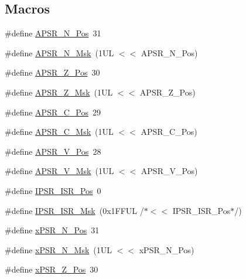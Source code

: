 \subsection*{Macros}
\begin{DoxyCompactItemize}
\item 
\#define \hyperlink{group___c_m_s_i_s___c_o_r_e_gac469528d210043c7bd3f12f0e6824766}{A\+P\+S\+R\+\_\+\+N\+\_\+\+Pos}~31
\item 
\#define \hyperlink{group___c_m_s_i_s___c_o_r_e_gadbc2cf55a026f661b53fadfcf822cef1}{A\+P\+S\+R\+\_\+\+N\+\_\+\+Msk}~(1\+U\+L $<$$<$ A\+P\+S\+R\+\_\+\+N\+\_\+\+Pos)
\item 
\#define \hyperlink{group___c_m_s_i_s___c_o_r_e_ga3661286d108b1aca308d7445685eae3a}{A\+P\+S\+R\+\_\+\+Z\+\_\+\+Pos}~30
\item 
\#define \hyperlink{group___c_m_s_i_s___c_o_r_e_ga1deb4d1aa72bb83d1f79329406f15711}{A\+P\+S\+R\+\_\+\+Z\+\_\+\+Msk}~(1\+U\+L $<$$<$ A\+P\+S\+R\+\_\+\+Z\+\_\+\+Pos)
\item 
\#define \hyperlink{group___c_m_s_i_s___c_o_r_e_ga6cf72aa6f09a168f9e5beda1a4a887b9}{A\+P\+S\+R\+\_\+\+C\+\_\+\+Pos}~29
\item 
\#define \hyperlink{group___c_m_s_i_s___c_o_r_e_ga6d47803fbad455bc10bd1ce59f2f335d}{A\+P\+S\+R\+\_\+\+C\+\_\+\+Msk}~(1\+U\+L $<$$<$ A\+P\+S\+R\+\_\+\+C\+\_\+\+Pos)
\item 
\#define \hyperlink{group___c_m_s_i_s___c_o_r_e_gac62830f67679ccd11658c4172c3e6ea7}{A\+P\+S\+R\+\_\+\+V\+\_\+\+Pos}~28
\item 
\#define \hyperlink{group___c_m_s_i_s___c_o_r_e_ga33305d6701356bff6890b315fe8b5489}{A\+P\+S\+R\+\_\+\+V\+\_\+\+Msk}~(1\+U\+L $<$$<$ A\+P\+S\+R\+\_\+\+V\+\_\+\+Pos)
\item 
\#define \hyperlink{group___c_m_s_i_s___c_o_r_e_ga0e34027584d02c43811ae908a5ca9adf}{I\+P\+S\+R\+\_\+\+I\+S\+R\+\_\+\+Pos}~0
\item 
\#define \hyperlink{group___c_m_s_i_s___c_o_r_e_gaf013a4579a64d1f21f56ea9f1b33ab56}{I\+P\+S\+R\+\_\+\+I\+S\+R\+\_\+\+Msk}~(0x1\+F\+F\+U\+L /$\ast$$<$$<$ I\+P\+S\+R\+\_\+\+I\+S\+R\+\_\+\+Pos$\ast$/)
\item 
\#define \hyperlink{group___c_m_s_i_s___c_o_r_e_ga031eb1b8ebcdb3d602d0b9f2ec82a7ae}{x\+P\+S\+R\+\_\+\+N\+\_\+\+Pos}~31
\item 
\#define \hyperlink{group___c_m_s_i_s___c_o_r_e_gaf600f4ff41b62cf2f3b0a59b6d2e93d6}{x\+P\+S\+R\+\_\+\+N\+\_\+\+Msk}~(1\+U\+L $<$$<$ x\+P\+S\+R\+\_\+\+N\+\_\+\+Pos)
\item 
\#define \hyperlink{group___c_m_s_i_s___c_o_r_e_ga5869dd608eea73c80f0567d781d2230b}{x\+P\+S\+R\+\_\+\+Z\+\_\+\+Pos}~30
$$
\end{DoxyCompactItemize}
